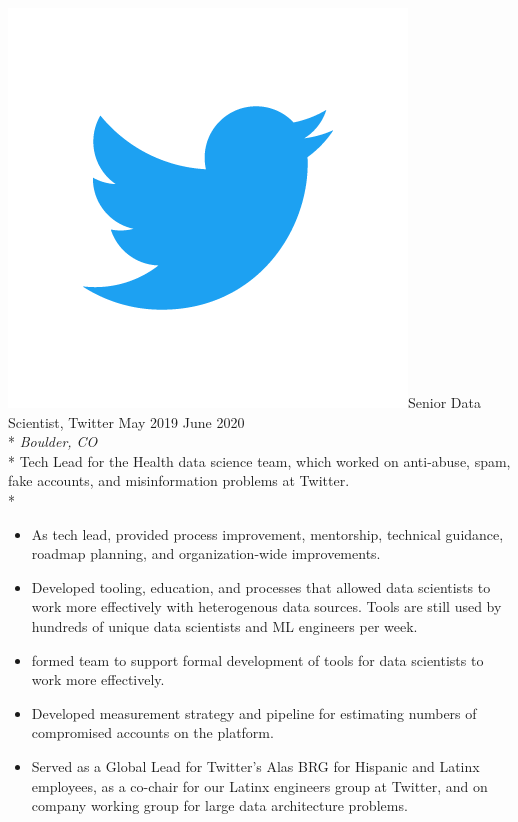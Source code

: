 \documentclass[print]{friggeri-cv} %
\newcommand{\twittericon}{\includegraphics[scale=0.05]{Twitter_Logo_Blue.png}}%
\begin{document}
\begin{description} \itemsep1pt \parskip0pt 
  \item \twittericon {\largeheaderfont Senior Data Scientist, Twitter} \hfill
    {\smallheaderfont May 2019 \textemdash June 2020}\\*
    {\footnotesize \emph{Boulder, CO}} \\*
    Tech Lead for the Health data science team, which worked on
    anti-abuse, spam, fake accounts, and misinformation problems at Twitter. \\*
    \begin{itemize} \itemsep0.5pt \parskip0pt 
      \item As tech lead, provided process improvement, mentorship, technical guidance, roadmap
      planning, and organization-wide improvements.
      
      \item Developed tooling, education, and processes that allowed data scientists to work more effectively with 
      heterogenous data sources. Tools are still used by hundreds of unique data scientists and ML engineers per week.

      \item formed team to support formal development of tools for data scientists to work more effectively.

      \item Developed measurement strategy and pipeline for estimating numbers of compromised accounts on the platform.
      
      \item Served as a Global Lead for Twitter's Alas BRG for Hispanic and
      Latinx employees, as a co-chair for our Latinx engineers group at Twitter, and on 
      company working group for large data architecture problems.
      
  \end{itemize}

  \end{description}
\end{document}
